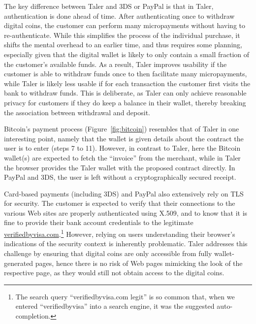 \documentclass{IEEEtran}
\begin{document}
The key difference between Taler and 3DS or PayPal is that
in Taler, authentication is done ahead of time.
After authenticating once to withdraw digital coins, the customer can
perform many micropayments without having to re-authenticate.  While
this simplifies the process of the individual purchase, it shifts the
mental overhead to an earlier time, and thus requires some planning,
especially given that the digital wallet is likely to only contain a
small fraction of the customer's available funds.  As a result, Taler
improves usability if the customer is able to withdraw funds once to
then facilitate many micropayments, while Taler is likely less usable
if for each transaction the customer first visits the bank to withdraw
funds.  This is deliberate, as Taler can only achieve reasonable
privacy for customers if they do keep a balance in their wallet,
thereby breaking the association between withdrawal and deposit.

Bitcoin's payment process (Figure~\ref{fig:bitcoin}) resembles that of
Taler in one interesting point, namely that the wallet is given
details about the contract the user is to enter (steps 7 to 11).
However, in contrast to Taler, here the Bitcoin wallet(s) are expected
to fetch the ``invoice'' from the merchant, while in Taler the browser
provides the Taler wallet with the proposed contract directly.  In
PayPal and 3DS, the user is left without a cryptographically secured
receipt.

Card-based payments (including 3DS) and PayPal also extensively rely
on TLS for security.  The customer is expected to verify that their
connections to the various Web sites are properly authenticated using
X.509, and to know that it is fine to provide their bank account
credentials to the legitimate
\url{verifiedbyvisa.com}.\footnote{The search query
``verifiedbyvisa.com legit'' is so common that, when we entered
``verifiedbyvisa'' into a search engine, it was the suggested
auto-completion.}  However, relying on users understanding their
browser's indications of the security context is inherently
problematic.  Taler addresses this challenge by ensuring that digital
coins are only accessible from fully wallet-generated pages, hence
there is no risk of Web pages mimicking the look of the respective
page, as they would still not obtain access to the digital coins.
\end{document}
